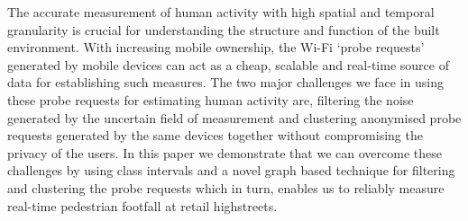The accurate measurement of human activity with high spatial and temporal granularity is crucial for understanding the structure and function of the built environment.
With increasing mobile ownership, the Wi-Fi `probe requests' generated by mobile devices can act as a cheap, scalable and real-time source of data for establishing such measures.
The two major challenges we face in using these probe requests for estimating human activity are, filtering the noise generated by the uncertain field of measurement and clustering anonymised probe requests generated by the same devices together without compromising the privacy of the users.
In this paper we demonstrate that we can overcome these challenges by using class intervals and a novel graph based technique for filtering and clustering the probe requests which in turn, enables us to reliably measure real-time pedestrian footfall at retail highstreets.

